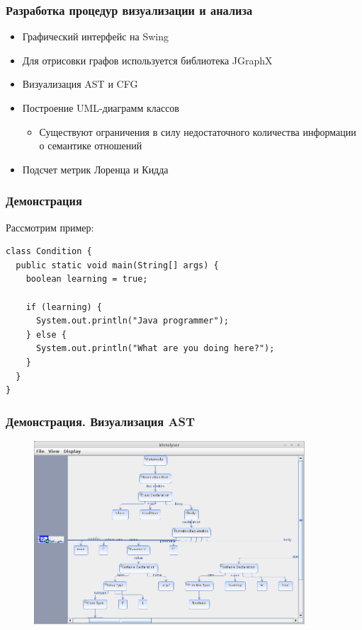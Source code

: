 \documentclass{beamer}
\begin{document}
\begin{frame}
\frametitle{Разработка процедур визуализации и анализа}

\begin{itemize}
    \item Графический интерфейс на Swing
    \item Для отрисовки графов используется библиотека JGraphX
    \item Визуализация AST и CFG
    \item Построение UML-диаграмм классов
        \begin{itemize}
            \item Существуют ограничения в силу недостаточного количества
            информации о семантике отношений
        \end{itemize}
    \item Подсчет метрик Лоренца и Кидда
\end{itemize}

\end{frame}
\begin{frame}[fragile]
\frametitle{Демонстрация}

Рассмотрим пример:

\begin{lstlisting}
class Condition {
  public static void main(String[] args) {
    boolean learning = true;

    if (learning) {
      System.out.println("Java programmer");
    } else {
      System.out.println("What are you doing here?");
    }
  }
}
\end{lstlisting}

\end{frame}
\begin{frame}
\frametitle{Демонстрация. Визуализация AST}

\begin{figure}[h]
    \begin{center}
        \includegraphics[width=0.9\textwidth]{../fig/ast_test1.png}
    \end{center}
\end{figure}

\end{frame}
\end{document}

